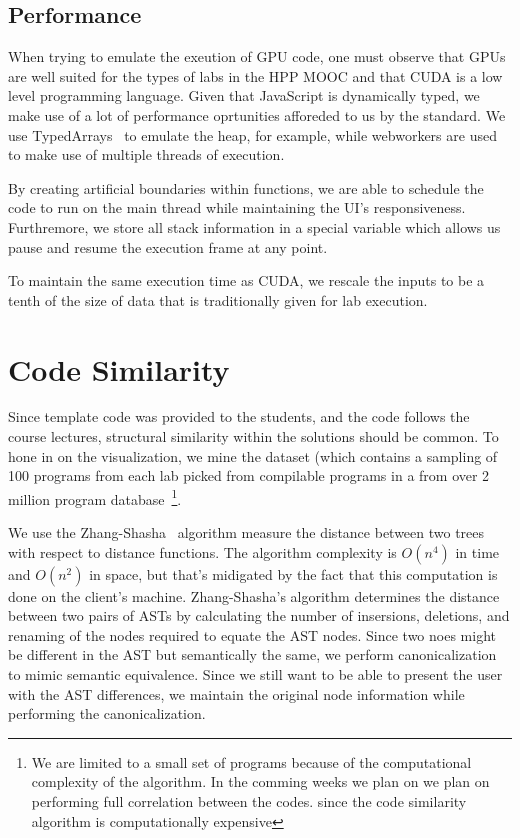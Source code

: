 \documentclass[nocopyrightspace]{sigchi}
\begin{document}
\subsection{Performance}

When trying to emulate the exeution of GPU code, one must observe that GPUs
are well suited for the types of labs in the HPP MOOC and that CUDA is a 
low level programming language. Given that JavaScript is dynamically typed,
we make use of a lot of performance oprtunities afforeded to us by the standard.
We use TypedArrays~\cite{guha2010essence,maffeis2008operational} to emulate the heap,
for example, while webworkers are used
to make use of multiple threads of execution.

By creating artificial boundaries within functions, we are able to schedule
the code to run on the main thread while maintaining the UI's responsiveness.
Furthremore, we store all stack information in a special variable which 
allows us pause and resume the execution frame at any point.

To maintain the same execution time as CUDA, we rescale the inputs to be a
tenth of the size of data that is traditionally given for lab execution.



\section{Code Similarity}

Since template code was provided to the students, and the code follows the course
lectures, structural similarity within the solutions should be common. To hone in
on the visualization, we mine the dataset (which contains a sampling of 100 programs
from each lab picked from compilable programs in a  from over 2 million program
database~\footnote{We are limited to a small set of programs because
of the computational complexity of the algorithm. In the comming weeks we plan on
we plan on performing full correlation between the codes. since
the code similarity algorithm is computationally expensive}.

We use the Zhang-Shasha~\cite{zhang1989simple} algorithm measure the distance between two trees with respect to
distance functions. The algorithm complexity is $O(n^4)$ in time and $O(n^2)$ in space, but
that's midigated by the fact that this computation is done on the client's machine.
Zhang-Shasha's algorithm determines the distance between two pairs of ASTs by
calculating the number of insersions, deletions, and renaming of the nodes
required to equate the AST nodes. Since two noes might be different in the AST but semantically
the same, we perform canonicalization to mimic semantic equivalence. Since we still want
to be able to present the user with the AST differences, we maintain the original node
information while performing the canonicalization.
\end{document}
